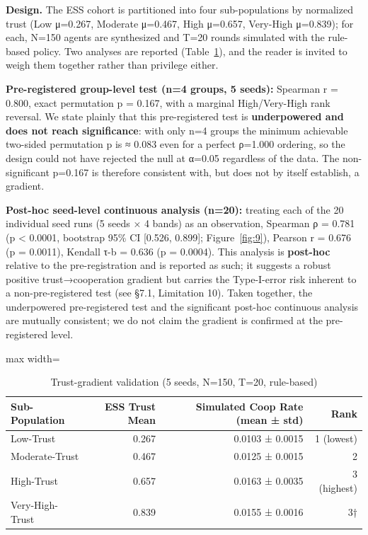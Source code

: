 \textbf{Design.} The ESS cohort is partitioned into four sub-populations by normalized trust (Low μ=0.267, Moderate μ=0.467, High μ=0.657, Very-High μ=0.839); for each, N=150 agents are synthesized and T=20 rounds simulated with the rule-based policy. Two analyses are reported (Table~\ref{tab:5}), and the reader is invited to weigh them together rather than privilege either.

\textbf{Pre-registered group-level test (n=4 groups, 5 seeds):} Spearman r = 0.800, exact permutation p = 0.167, with a marginal High/Very-High rank reversal. We state plainly that this pre-registered test is \textbf{underpowered and does not reach significance}: with only n=4 groups the minimum achievable two-sided permutation p is ≈ 0.083 even for a perfect ρ=1.000 ordering, so the design could not have rejected the null at α=0.05 regardless of the data. The non-significant p=0.167 is therefore consistent with, but does not by itself establish, a gradient.

\textbf{Post-hoc seed-level continuous analysis (n=20):} treating each of the 20 individual seed runs (5 seeds × 4 bands) as an observation, Spearman ρ = 0.781 (p < 0.0001, bootstrap 95\% CI [0.526, 0.899]; Figure~\ref{fig:9}), Pearson r = 0.676 (p = 0.0011), Kendall τ-b = 0.636 (p = 0.0004). This analysis is \textbf{post-hoc} relative to the pre-registration and is reported as such; it suggests a robust positive trust→cooperation gradient but carries the Type-I-error risk inherent to a non-pre-registered test (see §7.1, Limitation 10). Taken together, the underpowered pre-registered test and the significant post-hoc continuous analysis are mutually consistent; we do not claim the gradient is confirmed at the pre-registered level.


\begin{table}[H]
\centering
\caption{Trust-gradient validation (5 seeds, N=150, T=20, rule-based)}
\label{tab:5}
\footnotesize
\begin{adjustbox}{max width=\textwidth}
\begin{tabular}{lrrr}
\toprule
Sub-Population & ESS Trust Mean & Simulated Coop Rate (mean ± std) & Rank \\
\midrule
Low-Trust & 0.267 & 0.0103 ± 0.0015 & 1 (lowest) \\
Moderate-Trust & 0.467 & 0.0125 ± 0.0015 & 2 \\
High-Trust & 0.657 & 0.0163 ± 0.0035 & 3 (highest) \\
Very-High-Trust & 0.839 & 0.0155 ± 0.0016 & 3† \\
\bottomrule
\end{tabular}
\end{adjustbox}
\end{table}

